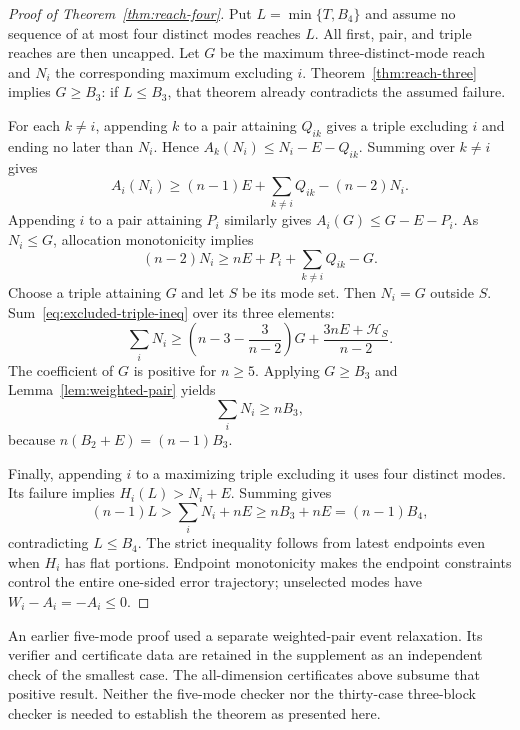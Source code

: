 \begin{proof}[Proof of Theorem~\ref{thm:reach-four}]
Put $L=\min\{T,B_4\}$ and assume no sequence of at most four distinct
modes reaches $L$. All first, pair, and triple reaches are then uncapped.
Let $G$ be the maximum three-distinct-mode reach and $N_i$ the corresponding
maximum excluding $i$. Theorem~\ref{thm:reach-three} implies $G\ge B_3$:
if $L\le B_3$, that theorem already contradicts the assumed failure.

For each $k\ne i$, appending $k$ to a pair attaining $Q_{ik}$ gives
a triple excluding $i$ and ending no later than $N_i$. Hence
$A_k(N_i)\le N_i-E-Q_{ik}$. Summing over $k\ne i$ gives
\[
 A_i(N_i)\ge(n-1)E+\sum_{k\ne i}Q_{ik}-(n-2)N_i.
\]
Appending $i$ to a pair attaining $P_i$ similarly gives
$A_i(G)\le G-E-P_i$. As $N_i\le G$, allocation monotonicity implies
\begin{equation}\label{eq:excluded-triple-ineq}
 (n-2)N_i\ge nE+P_i+\sum_{k\ne i}Q_{ik}-G.
\end{equation}
Choose a triple attaining $G$ and let $S$ be its mode set. Then $N_i=G$
outside $S$. Sum~\eqref{eq:excluded-triple-ineq} over its three elements:
\[
 \sum_iN_i\ge\left(n-3-\frac3{n-2}\right)G
                  +\frac{3nE+\mathcal H_S}{n-2}.
\]
The coefficient of $G$ is positive for $n\ge5$. Applying
$G\ge B_3$ and Lemma~\ref{lem:weighted-pair} yields
\begin{equation}\label{eq:aggregate-triple}
 \sum_iN_i\ge nB_3,
\end{equation}
because $n(B_2+E)=(n-1)B_3$.

Finally, appending $i$ to a maximizing triple excluding it uses four
distinct modes. Its failure implies $H_i(L)>N_i+E$. Summing gives
\[
 (n-1)L>\sum_iN_i+nE\ge nB_3+nE=(n-1)B_4,
\]
contradicting $L\le B_4$. The strict inequality follows from latest
endpoints even when $H_i$ has flat portions. Endpoint monotonicity makes
the endpoint constraints control the entire one-sided error trajectory;
unselected modes have $W_i-A_i=-A_i\le0$.
\end{proof}

An earlier five-mode proof used a separate weighted-pair event relaxation.
Its verifier and certificate data are retained in the supplement as an
independent check of the smallest case. The all-dimension certificates
above subsume that positive result. Neither the five-mode checker nor the
thirty-case three-block checker is needed to establish the theorem as
presented here.
